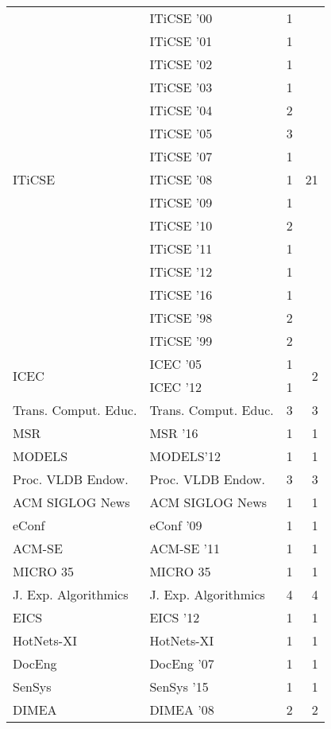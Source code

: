\begin{table*}[t]
\begin{tabular}{llrr}
\multirow{15}{*}{ITiCSE } & ITiCSE '00 & 1 & \multirow{15}{*}{21}\\
& ITiCSE '01 & 1 &\\
& ITiCSE '02 & 1 &\\
& ITiCSE '03 & 1 &\\
& ITiCSE '04 & 2 &\\
& ITiCSE '05 & 3 &\\
& ITiCSE '07 & 1 &\\
& ITiCSE '08 & 1 &\\
& ITiCSE '09 & 1 &\\
& ITiCSE '10 & 2 &\\
& ITiCSE '11 & 1 &\\
& ITiCSE '12 & 1 &\\
& ITiCSE '16 & 1 &\\
& ITiCSE '98 & 2 &\\
& ITiCSE '99 & 2 &\\
\multirow{2}{*}{ICEC } & ICEC '05 & 1 & \multirow{2}{*}{2}\\
& ICEC '12 & 1 &\\
\multirow{1}{*}{Trans. Comput. Educ.} & Trans. Comput. Educ. & 3 & \multirow{1}{*}{3}\\
\multirow{1}{*}{MSR } & MSR '16 & 1 & \multirow{1}{*}{1}\\
\multirow{1}{*}{MODELS} & MODELS'12 & 1 & \multirow{1}{*}{1}\\
\multirow{1}{*}{Proc. VLDB Endow.} & Proc. VLDB Endow. & 3 & \multirow{1}{*}{3}\\
\multirow{1}{*}{ACM SIGLOG News} & ACM SIGLOG News & 1 & \multirow{1}{*}{1}\\
\multirow{1}{*}{eConf } & eConf '09 & 1 & \multirow{1}{*}{1}\\
\multirow{1}{*}{ACM-SE } & ACM-SE '11 & 1 & \multirow{1}{*}{1}\\
\multirow{1}{*}{MICRO 35} & MICRO 35 & 1 & \multirow{1}{*}{1}\\
\multirow{1}{*}{J. Exp. Algorithmics} & J. Exp. Algorithmics & 4 & \multirow{1}{*}{4}\\
\multirow{1}{*}{EICS } & EICS '12 & 1 & \multirow{1}{*}{1}\\
\multirow{1}{*}{HotNets-XI} & HotNets-XI & 1 & \multirow{1}{*}{1}\\
\multirow{1}{*}{DocEng } & DocEng '07 & 1 & \multirow{1}{*}{1}\\
\multirow{1}{*}{SenSys } & SenSys '15 & 1 & \multirow{1}{*}{1}\\
\multirow{1}{*}{DIMEA } & DIMEA '08 & 2 & \multirow{1}{*}{2}\\

\end{tabular}
\end{table*}
